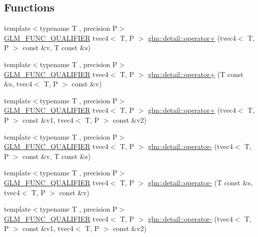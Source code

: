 \subsection*{Functions}
\begin{DoxyCompactItemize}
\item 
{\footnotesize template$<$typename T , precision P$>$ }\\\hyperlink{setup_8hpp_a33fdea6f91c5f834105f7415e2a64407}{G\+L\+M\+\_\+\+F\+U\+N\+C\+\_\+\+Q\+U\+A\+L\+I\+F\+I\+ER} tvec4$<$ T, P $>$ \hyperlink{namespaceglm_1_1detail_ab302a84945fa25d73e097e8c58e39a38}{glm\+::detail\+::operator+} (tvec4$<$ T, P $>$ const \&v, T const \&s)
\item 
{\footnotesize template$<$typename T , precision P$>$ }\\\hyperlink{setup_8hpp_a33fdea6f91c5f834105f7415e2a64407}{G\+L\+M\+\_\+\+F\+U\+N\+C\+\_\+\+Q\+U\+A\+L\+I\+F\+I\+ER} tvec4$<$ T, P $>$ \hyperlink{namespaceglm_1_1detail_a7a2add821a5a575ae38026774f520c8d}{glm\+::detail\+::operator+} (T const \&s, tvec4$<$ T, P $>$ const \&v)
\item 
{\footnotesize template$<$typename T , precision P$>$ }\\\hyperlink{setup_8hpp_a33fdea6f91c5f834105f7415e2a64407}{G\+L\+M\+\_\+\+F\+U\+N\+C\+\_\+\+Q\+U\+A\+L\+I\+F\+I\+ER} tvec4$<$ T, P $>$ \hyperlink{namespaceglm_1_1detail_a830839452c72abdedf0c8ccae265749d}{glm\+::detail\+::operator+} (tvec4$<$ T, P $>$ const \&v1, tvec4$<$ T, P $>$ const \&v2)
\item 
{\footnotesize template$<$typename T , precision P$>$ }\\\hyperlink{setup_8hpp_a33fdea6f91c5f834105f7415e2a64407}{G\+L\+M\+\_\+\+F\+U\+N\+C\+\_\+\+Q\+U\+A\+L\+I\+F\+I\+ER} tvec4$<$ T, P $>$ \hyperlink{namespaceglm_1_1detail_ab9b0a83328af8a0e1cf8111c18ccd999}{glm\+::detail\+::operator-\/} (tvec4$<$ T, P $>$ const \&v, T const \&s)
\item 
{\footnotesize template$<$typename T , precision P$>$ }\\\hyperlink{setup_8hpp_a33fdea6f91c5f834105f7415e2a64407}{G\+L\+M\+\_\+\+F\+U\+N\+C\+\_\+\+Q\+U\+A\+L\+I\+F\+I\+ER} tvec4$<$ T, P $>$ \hyperlink{namespaceglm_1_1detail_a82143dfffccff090e26d363e97a17d75}{glm\+::detail\+::operator-\/} (T const \&s, tvec4$<$ T, P $>$ const \&v)
\item 
{\footnotesize template$<$typename T , precision P$>$ }\\\hyperlink{setup_8hpp_a33fdea6f91c5f834105f7415e2a64407}{G\+L\+M\+\_\+\+F\+U\+N\+C\+\_\+\+Q\+U\+A\+L\+I\+F\+I\+ER} tvec4$<$ T, P $>$ \hyperlink{namespaceglm_1_1detail_ad820df4e7fb6970df4e5999c86b37e05}{glm\+::detail\+::operator-\/} (tvec4$<$ T, P $>$ const \&v1, tvec4$<$ T, P $>$ const \&v2)

\end{DoxyCompactItemize}
